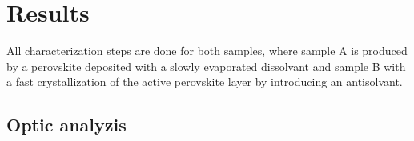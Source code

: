 


\section{Results}
\label{sec:Results}

All characterization steps are done for both samples, where sample A is produced by a perovskite deposited with a slowly evaporated dissolvant 
and sample B with a fast crystallization of the active perovskite layer by introducing an antisolvant.

\subsection{Optic analyzis}
\label{sec:optic-analyzis}


